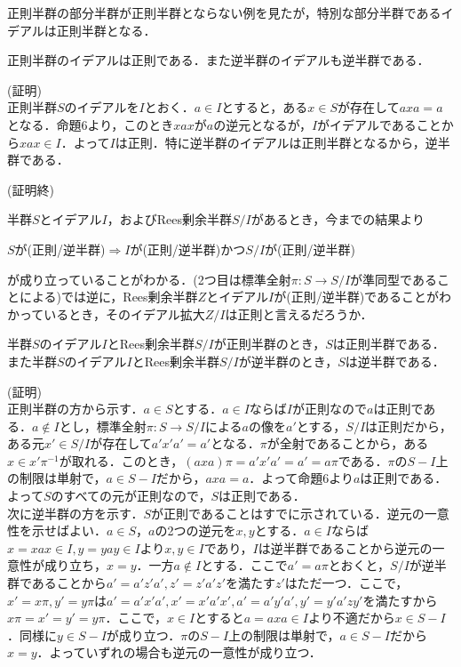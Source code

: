 正則半群の部分半群が正則半群とならない例を見たが，特別な部分半群であるイデアルは正則半群となる．
\begin{sprop}
正則半群のイデアルは正則である．また逆半群のイデアルも逆半群である．
\end{sprop}
(証明)\\
正則半群$S$のイデアルを$I$とおく．$a\in I$とすると，ある$x\in S$が存在して$axa=a$となる．命題6より，このとき$xax$が$a$の逆元となるが，$I$がイデアルであることから$xax\in I$．よって$I$は正則．特に逆半群のイデアルは正則半群となるから，逆半群である．
\begin{flushright}
(証明終)
\end{flushright}
半群$S$とイデアル$I$，およびRees剰余半群$S/I$があるとき，今までの結果より
\begin{center}
 $S$が(正則/逆半群)$\Rightarrow I$が(正則/逆半群)かつ$S/I$が(正則/逆半群)
\end{center}
が成り立っていることがわかる．(2つ目は標準全射$\pi:S\rightarrow S/I$が準同型であることによる)では逆に，Rees剰余半群$Z$とイデアル$I$が(正則/逆半群)であることがわかっているとき，そのイデアル拡大$Z/I$は正則と言えるだろうか．
\begin{sthm}
半群$S$のイデアル$I$とRees剰余半群$S/I$が正則半群のとき，$S$は正則半群である．また半群$S$のイデアル$I$とRees剰余半群$S/I$が逆半群のとき，$S$は逆半群である．
\end{sthm}
(証明)\\
正則半群の方から示す．$a\in S$とする．$a\in I$ならば$I$が正則なので$a$は正則である．$a\notin I$とし，標準全射$\pi:S\rightarrow S/I$による$a$の像を$a'$とする，$S/I$は正則だから，ある元$x'\in S/I$が存在して$a'x'a'=a'$となる．$\pi$が全射であることから，ある$x\in x'\pi^{-1}$が取れる．このとき，$(axa)\pi=a'x'a'=a'=a\pi$である．$\pi$の$S-I$上の制限は単射で，$a\in S-I$だから，$axa=a$．よって命題6より$a$は正則である．よって$S$のすべての元が正則なので，$S$は正則である．\\
次に逆半群の方を示す．$S$が正則であることはすでに示されている．逆元の一意性を示せばよい．$a\in S$，$a$の2つの逆元を$x,y$とする．$a\in I$ならば$x=xax\in I,y=yay\in I$より$x,y\in I$であり，$I$は逆半群であることから逆元の一意性が成り立ち，$x=y$．一方$a\notin I$とする．ここで$a'=a\pi$とおくと，$S/I$が逆半群であることから$a'=a'z'a', z'=z'a'z'$を満たす$z'$はただ一つ．ここで，$x'=x\pi,y'=y\pi$は$a'=a'x'a', x'=x'a'x', a'=a'y'a', y'=y'a'zy'$を満たすから$x\pi=x'=y'=y\pi$．ここで，$x\in I$とすると$a=axa\in I$より不適だから$x\in S-I$．同様に$y\in S-I$が成り立つ．$\pi$の$S-I$上の制限は単射で，$a\in S-I$だから$x=y$．よっていずれの場合も逆元の一意性が成り立つ．
